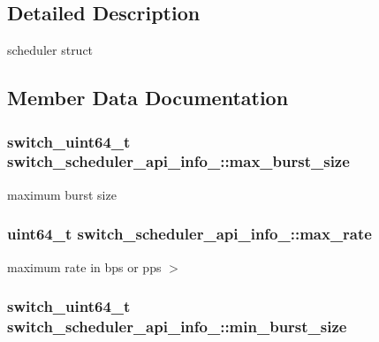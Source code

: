 \subsection{Detailed Description}
scheduler struct 

\subsection{Member Data Documentation}
\hypertarget{structswitch__scheduler__api__info___a21ff5ba4e054aa95741df42277cb5625}{
\subsubsection[{max\+\_\+burst\+\_\+size}]{\setlength{\rightskip}{0pt plus 5cm}switch\+\_\+uint64\+\_\+t switch\+\_\+scheduler\+\_\+api\+\_\+info\+\_\+\+::max\+\_\+burst\+\_\+size}}\label{structswitch__scheduler__api__info___a21ff5ba4e054aa95741df42277cb5625}
maximum burst size \hypertarget{structswitch__scheduler__api__info___a9e2c38f94350f794aad12da23c48ae55}{
\subsubsection[{max\+\_\+rate}]{\setlength{\rightskip}{0pt plus 5cm}uint64\+\_\+t switch\+\_\+scheduler\+\_\+api\+\_\+info\+\_\+\+::max\+\_\+rate}}\label{structswitch__scheduler__api__info___a9e2c38f94350f794aad12da23c48ae55}
maximum rate in bps or pps $>$ \hypertarget{structswitch__scheduler__api__info___a4b941fa3f027b64a80023e2a793c2099}{
\subsubsection[{min\+\_\+burst\+\_\+size}]{\setlength{\rightskip}{0pt plus 5cm}switch\+\_\+uint64\+\_\+t switch\+\_\+scheduler\+\_\+api\+\_\+info\+\_\+\+::min\+\_\+burst\+\_\+size}}\label{structswitch__scheduler__api__info___a4b941fa3f027b64a80023e2a793c2099}

